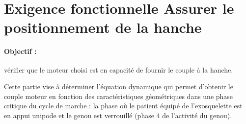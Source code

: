 %
%
%
%
%
%
%
%
%

\newpage

\section{Exigence fonctionnelle \og Assurer le positionnement de la hanche\fg}


\paragraph{Objectif :} vérifier que le moteur choisi est en capacité de fournir le couple à la hanche.

Cette partie vise à déterminer l'équation dynamique qui permet d'obtenir le couple moteur en fonction des caractéristiques géométriques dans une phase critique du cycle de marche : la phase où le patient équipé de l'exosquelette est en appui unipode et le genou est verrouillé (phase 4 de
l'activité du genou).

